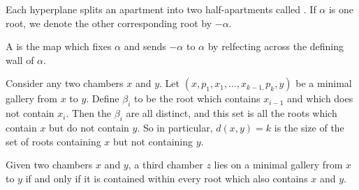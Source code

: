 \documentclass[11pt]{article}
\begin{document}
\begin{definition}
    Each hyperplane splits an apartment into two half-apartments called . If $\alpha$ is one root, we denote the other corresponding root by $-\alpha$. 
\end{definition}




\begin{definition}\label{fold}
    A  is the map which fixes $\alpha$ and sends $-\alpha$ to $\alpha$ by relfecting across the defining wall of $\alpha$. 
\end{definition}

\begin{proposition}
    Consider any two chambers $x$ and $y$. Let $(x,p_1,x_1,\hdots ,x_{k-1,}p_k,y)$ be a minimal gallery from $x$ to $y$. Define $\beta_i$ to be the root which contains $x_{i-1}$ and which does not contain $x_i$. Then the $\beta_i$ are all distinct, and this set is all the roots which contain $x$ but do not contain $y$. So in particular, $d(x,y)=k$ is the size of the set of roots containing $x$ but not containing $y$. 
\end{proposition}

\begin{proposition}
    Given two chambers $x$ and $y$, a third chamber $z$ lies on a minimal gallery from $x$ to $y$ if and only if it is contained within every root which also contains $x$ and $y$. 
\end{proposition}
\end{document}
